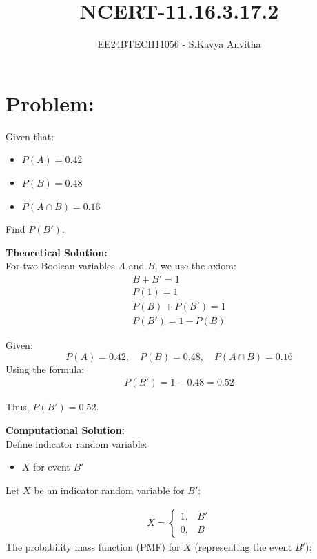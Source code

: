 \documentclass[journal]{IEEEtran}
\begin{document}

\vspace{3cm}

\title{\\NCERT-11.16.3.17.2}
\author{EE24BTECH11056 - S.Kavya Anvitha}
\maketitle
\bigskip

\renewcommand{\thefigure}{\theenumi}
\renewcommand{\thetable}{\theenumi}
\section*{Problem:}
Given that:
\begin{itemize}
    \item $P(A) = 0.42$
    \item $P(B) = 0.48$
    \item $P(A \cap B) = 0.16$
\end{itemize}
Find $P(B')$.

\textbf{Theoretical Solution:}\\
For two Boolean variables \( A \) and \( B \), we use the axiom:
\begin{align}
B+B'=1\\
P(1)=1\\
P(B)+P(B')=1\\
  P(B') = 1 - P(B)  
\end{align}

Given:
\[
P(A) = 0.42, \quad P(B) = 0.48, \quad P(A \cap B) = 0.16
\]
Using the formula:
\begin{align}
 P(B') = 1 - 0.48 = 0.52   
\end{align}


Thus, \( P(B') = 0.52 \).

\vspace{1cm}

\textbf{Computational Solution:}\\
Define indicator random variable:

\begin{itemize}
    \item \( X \) for event \( B' \)
\end{itemize}



Let \( X \) be an indicator random variable for \( B' \):

\begin{align}
X =
\begin{cases}
1 ,& B'\\
0 ,& B
\end{cases}
\end{align}
The probability mass function (PMF) for \( X \) (representing the event \( B' \)):
\end{document}
